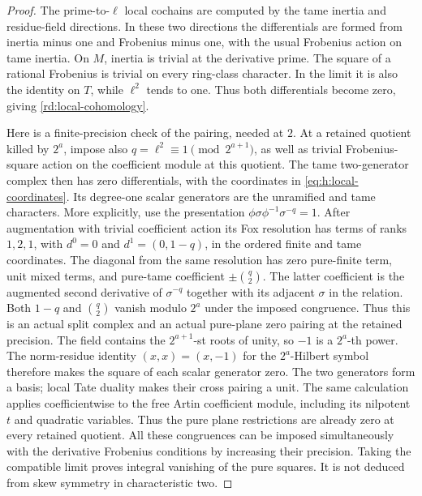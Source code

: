 \begin{proof}
The prime-to-\(\ell\) local cochains are computed by the tame inertia and
residue-field directions.  In these two directions the differentials
are formed from inertia minus one and Frobenius minus one, with the
usual Frobenius action on tame inertia.  On \(M\), inertia is trivial at
the derivative prime.  The square of a rational Frobenius is trivial
on every ring-class character.  In the limit it is also the identity on
\(T\), while \(\ell^2\) tends to one.  Thus both differentials become zero,
giving \eqref{rd:local-cohomology}.

Here is a finite-precision check of the pairing, needed at \(2\).
At a retained quotient killed by \(2^a\), impose also
\(q=\ell^2\equiv1\pmod{2^{a+1}}\), as well as trivial
Frobenius-square action on the coefficient module at this quotient.
The tame two-generator complex then has zero differentials,
with the coordinates in \eqref{eq:h:local-coordinates}.  Its degree-one
scalar generators are the unramified and tame characters.
More explicitly, use the presentation
\(\phi\sigma\phi^{-1}\sigma^{-q}=1\).
After augmentation with trivial coefficient action its Fox
resolution has terms of ranks \(1,2,1\), with
\(d^0=0\) and \(d^1=(0,1-q)\), in the ordered finite and
tame coordinates.  The diagonal from the same resolution
has zero pure-finite term, unit mixed terms, and pure-tame
coefficient \(\pm\binom q2\).  The latter coefficient is
the augmented second derivative of \(\sigma^{-q}\)
together with its adjacent \(\sigma\) in the relation.
Both \(1-q\) and \(\binom q2\) vanish modulo \(2^a\)
under the imposed congruence.  Thus this is an actual
split complex and an actual pure-plane zero pairing
at the retained precision.
The field contains the \(2^{a+1}\)-st roots of unity, so
\(-1\) is a \(2^a\)-th power.  The norm-residue identity
\((x,x)=(x,-1)\) for the \(2^a\)-Hilbert symbol therefore
makes the square of each scalar generator zero.
The two generators form a basis; local Tate duality makes
their cross pairing a unit.  The same calculation applies
coefficientwise to the free Artin coefficient module, including
its nilpotent \(t\) and quadratic variables.  Thus the pure
plane restrictions are already zero at every retained quotient.
All these congruences can be imposed simultaneously with the
derivative Frobenius conditions by increasing their precision.
Taking the compatible limit proves integral vanishing of the
pure squares.  It is not deduced from skew symmetry in
characteristic two.


\end{proof}
